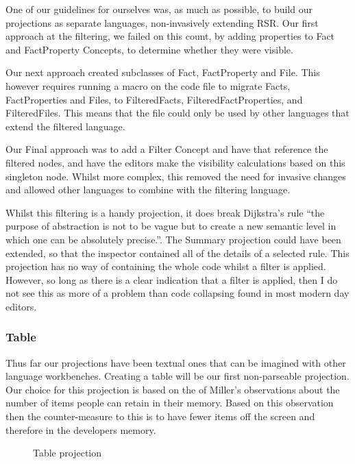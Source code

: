 One of our guidelines for ourselves was, as much as possible, to build our projections as separate languages, non-invasively extending RSR.
Our first approach at the filtering, we failed on this count, by adding properties to Fact and FactProperty Concepts, to determine whether they were visible.

Our next approach created subclasses of Fact, FactProperty and File.
This however requires running a macro on the code file to migrate Facts, FactProperties and Files, to FilteredFacts, FilteredFactProperties, and FilteredFiles.
This means that the file could only be used by other languages that extend the filtered language.

Our Final approach was to add a Filter Concept and have that reference the filtered nodes, and have the editors make the visibility calculations based on this singleton node.
Whilst more complex, this removed the need for invasive changes and allowed other languages to combine with the filtering language.

Whilst this filtering is a handy projection, it does break Dijkstra's rule ``the purpose of abstraction is not to be vague but to create a new semantic level in which one can be absolutely precise.''\cite{dijkstra1972humble}.
The Summary projection could have been extended, so that the inspector contained all of the details of a selected rule.
This projection has no way of containing the whole code whilst a filter is applied.
However, so long as there is a clear indication that a filter is applied, then I do not see this as more of a problem than code collapsing found in most modern day editors.

\subsubsection{Table}
Thus far our projections have been textual ones that can be imagined with other language workbenches.
Creating a table will be our first non-parseable projection.
Our choice for this projection is based on the of Miller's\cite{miller1956magical} observations about the number of items people can retain in their memory.
Based on this observation then the counter-measure to this is to have fewer items off the screen and therefore in the developers memory.

\begin{figure}[h]
    \centering
    \caption{Table projection}
    \label{fig:tableProjection1}
\end{figure}

